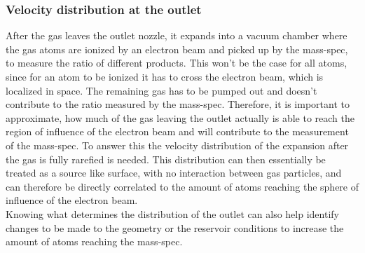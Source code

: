\subsubsection*{Velocity distribution at the outlet}

	After the gas leaves the outlet nozzle, it expands into a vacuum chamber where the gas atoms are ionized by an electron beam and picked up by the mass-spec, to measure the ratio of different products.
	This won't be the case for all atoms, since for an atom to be ionized it has to cross the electron beam, which is localized in space.
	The remaining gas has to be pumped out and doesn't contribute to the ratio measured by the mass-spec.
	Therefore, it is important to approximate, how much of the gas leaving the outlet actually is able to reach the region of influence of the electron beam and will contribute to the measurement of the mass-spec.
	To answer this the velocity distribution of the expansion after the gas is fully rarefied is needed.
	This distribution can then essentially be treated as a source like surface, with no interaction between gas particles, and can therefore be directly correlated to the amount of atoms reaching the sphere of influence of the electron beam.\\
	Knowing what determines the distribution of the outlet can also help identify changes to be made to the geometry or the reservoir conditions to increase the amount of atoms reaching the mass-spec.
